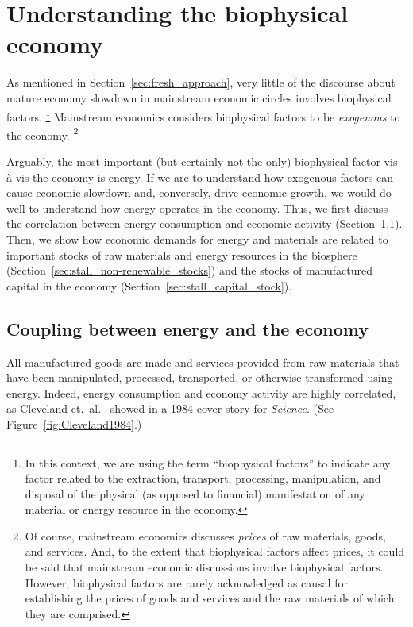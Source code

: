 \section{Understanding the biophysical economy}
\label{sec:exogenous_factors}

As mentioned in Section~\ref{sec:fresh_approach}, 
very little of the discourse 
about mature economy slowdown 
in mainstream economic circles
involves biophysical factors.%
	\footnote{
	In this context, we are using the term ``biophysical factors''
	to indicate any factor related to 
	the extraction, transport, processing, manipulation, and disposal 
	of the physical (as opposed to financial) manifestation 
	of any material or energy resource in the economy.
	}
Mainstream economics considers biophysical factors
to be \emph{exogenous} to the economy.%
	\footnote{
	Of course, mainstream economics discusses \emph{prices}
	of raw materials, goods, and services. 
	And, to the extent that biophysical factors affect prices,
	it could be said that mainstream economic discussions involve
	biophysical factors.
	However, biophysical factors are rarely acknowledged as causal 
	for establishing the prices of goods and services and the raw materials 
	of which they are comprised.
	}

Arguably, the most important (but certainly not the only) biophysical factor 
vis-\`{a}-vis the economy is energy.
If we are to understand how exogenous factors can cause economic slowdown
and, conversely, drive economic growth,
we would do well to understand how energy operates in the economy.
Thus, we first discuss the correlation 
between energy consumption and economic activity 
(Section~\ref{sec:energy-economy_coupling}).
Then, we show how economic demands for energy and materials
are related to important stocks 
of raw materials and energy resources in the biosphere 
(Section~\ref{sec:stall_non-renewable_stocks})
and the stocks of manufactured capital in the economy
(Section~\ref{sec:stall_capital_stock}).


\subsection{Coupling between energy and the economy}
\label{sec:energy-economy_coupling}

All manufactured goods are made and services provided
from raw materials that have been
manipulated, processed, transported, or otherwise transformed using energy.
Indeed, energy consumption and economy activity are highly correlated,
as Cleveland et.\ al.~\cite{Cleveland:1984aa} showed in a 1984 cover story for \emph{Science}. 
(See Figure~\ref{fig:Cleveland1984}.)

